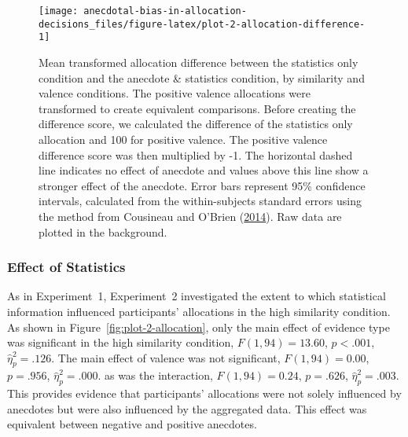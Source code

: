 \documentclass[
  man, donotrepeattitle,floatsintext]{apa7}
\theoremstyle{definition}
\theoremstyle{definition}
\theoremstyle{definition}
\theoremstyle{definition}
\theoremstyle{remark}
\begin{document}
\newpage

\begin{landscape}



\begin{figure}
\texttt{[image: anecdotal-bias-in-allocation-decisions\_files/figure-latex/plot-2-allocation-difference-1]} \caption{Mean transformed allocation difference between the statistics only condition and the anecdote \& statistics condition, by similarity and valence conditions. The positive valence allocations were transformed to create equivalent comparisons. Before creating the difference score, we calculated the difference of the statistics only allocation and 100 for positive valence. The positive valence difference score was then multiplied by -1. The horizontal dashed line indicates no effect of anecdote and values above this line show a stronger effect of the anecdote. Error bars represent 95\% confidence intervals, calculated from the within-subjects standard errors using the method from Cousineau and O'Brien (\protect\hyperlink{ref-cousineau2014}{2014}). Raw data are plotted in the background.}\label{fig:plot-2-allocation-difference}
\end{figure}

\end{landscape}

\newpage

\hypertarget{effect-of-statistics}{%
\subsubsection{Effect of Statistics}\label{effect-of-statistics}}

As in Experiment~1, Experiment~2 investigated the extent to which statistical
information influenced participants' allocations in the high similarity
condition. As shown in Figure~\ref{fig:plot-2-allocation}, only the
main effect of evidence type was significant in the high similarity condition,
\(F(1, 94) = 13.60\), \(p < .001\), \(\hat{\eta}^2_p = .126\). The main
effect of valence was not significant,
\(F(1, 94) = 0.00\), \(p = .956\), \(\hat{\eta}^2_p = .000\). as was the
interaction,
\(F(1, 94) = 0.24\), \(p = .626\), \(\hat{\eta}^2_p = .003\). This
provides evidence that participants' allocations were not solely influenced by
anecdotes but were also influenced by the aggregated data. This effect was
equivalent between negative and positive anecdotes.
\end{document}
